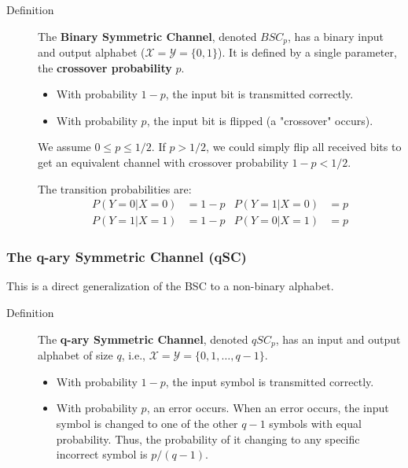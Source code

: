 \begin{description}
    \item[Definition] The \textbf{Binary Symmetric Channel}, denoted $BSC_p$, has a binary input and output alphabet ($\mathcal{X} = \mathcal{Y} = \{0, 1\}$). It is defined by a single parameter, the \textbf{crossover probability} $p$.
    \begin{itemize}
        \item With probability $1-p$, the input bit is transmitted correctly.
        \item With probability $p$, the input bit is flipped (a "crossover" occurs).
    \end{itemize}
    We assume $0 \le p \le 1/2$. If $p > 1/2$, we could simply flip all received bits to get an equivalent channel with crossover probability $1-p < 1/2$.

    The transition probabilities are:
    \begin{align*}
        P(Y=0|X=0) &= 1-p & P(Y=1|X=0) &= p \\
        P(Y=1|X=1) &= 1-p & P(Y=0|X=1) &= p
    \end{align*}
\end{description}


\subsubsection{The q-ary Symmetric Channel (qSC)}

This is a direct generalization of the BSC to a non-binary alphabet.

\begin{description}
    \item[Definition] The \textbf{q-ary Symmetric Channel}, denoted $qSC_p$, has an input and output alphabet of size $q$, i.e., $\mathcal{X} = \mathcal{Y} = \{0, 1, \dots, q-1\}$.
    \begin{itemize}
        \item With probability $1-p$, the input symbol is transmitted correctly.
        \item With probability $p$, an error occurs. When an error occurs, the input symbol is changed to one of the other $q-1$ symbols with equal probability. Thus, the probability of it changing to any specific incorrect symbol is $p/(q-1)$.
    \end{itemize}
\end{description}

